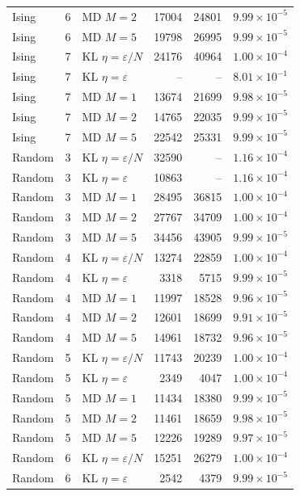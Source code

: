 \begin{table}[t]
\begin{tabular}{lllrrr}
Ising & 6 & MD $M=2$ & 17004 & 24801 & $9.99\times 10^{-5}$ \\
Ising & 6 & MD $M=5$ & 19798 & 26995 & $9.99\times 10^{-5}$ \\
\midrule
Ising & 7 & KL $\eta=\varepsilon/N$ & 24176 & 40964 & $1.00\times 10^{-4}$ \\
Ising & 7 & KL $\eta=\varepsilon$ & -- & -- & $8.01\times 10^{-1}$ \\
Ising & 7 & MD $M=1$ & 13674 & 21699 & $9.98\times 10^{-5}$ \\
Ising & 7 & MD $M=2$ & 14765 & 22035 & $9.99\times 10^{-5}$ \\
Ising & 7 & MD $M=5$ & 22542 & 25331 & $9.99\times 10^{-5}$ \\
\midrule
Random & 3 & KL $\eta=\varepsilon/N$ & 32590 & -- & $1.16\times 10^{-4}$ \\
Random & 3 & KL $\eta=\varepsilon$ & 10863 & -- & $1.16\times 10^{-4}$ \\
Random & 3 & MD $M=1$ & 28495 & 36815 & $1.00\times 10^{-4}$ \\
Random & 3 & MD $M=2$ & 27767 & 34709 & $1.00\times 10^{-4}$ \\
Random & 3 & MD $M=5$ & 34456 & 43905 & $9.99\times 10^{-5}$ \\
\midrule
Random & 4 & KL $\eta=\varepsilon/N$ & 13274 & 22859 & $1.00\times 10^{-4}$ \\
Random & 4 & KL $\eta=\varepsilon$ & 3318 & 5715 & $9.99\times 10^{-5}$ \\
Random & 4 & MD $M=1$ & 11997 & 18528 & $9.96\times 10^{-5}$ \\
Random & 4 & MD $M=2$ & 12601 & 18699 & $9.91\times 10^{-5}$ \\
Random & 4 & MD $M=5$ & 14961 & 18732 & $9.96\times 10^{-5}$ \\
\midrule
Random & 5 & KL $\eta=\varepsilon/N$ & 11743 & 20239 & $1.00\times 10^{-4}$ \\
Random & 5 & KL $\eta=\varepsilon$ & 2349 & 4047 & $1.00\times 10^{-4}$ \\
Random & 5 & MD $M=1$ & 11434 & 18380 & $9.99\times 10^{-5}$ \\
Random & 5 & MD $M=2$ & 11461 & 18659 & $9.98\times 10^{-5}$ \\
Random & 5 & MD $M=5$ & 12226 & 19289 & $9.97\times 10^{-5}$ \\
\midrule
Random & 6 & KL $\eta=\varepsilon/N$ & 15251 & 26279 & $1.00\times 10^{-4}$ \\
Random & 6 & KL $\eta=\varepsilon$ & 2542 & 4379 & $9.99\times 10^{-5}$ \\

\end{tabular}
\end{table}
